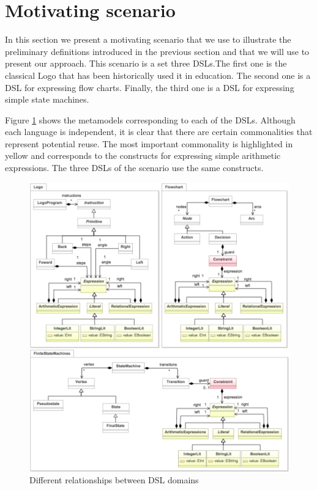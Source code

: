 \section{Motivating scenario}
\label{sec:motivatingscenario}

In this section we present a motivating scenario that we use to illustrate the preliminary definitions introduced in the previous section and that we will use to present our approach. This scenario is a set three DSLs.The first one is the classical Logo that has been historically used it in education. The second one is a DSL for expressing flow charts. Finally, the third one is a DSL for expressing simple state machines.

Figure \ref{fig:motivating-example} shows the metamodels corresponding to each of the DSLs. Although each language is independent, it is clear that there are certain commonalities that represent potential reuse. The most important commonality is highlighted in yellow and corresponds to the constructs for expressing simple arithmetic expressions. The three DSLs of the scenario use the same constructs. 

\begin{figure}
\centering
\includegraphics[width=1.05\linewidth]{images/motivating-example.pdf}
\caption{Different relationships between DSL domains}
\label{fig:motivating-example}
\end{figure}
